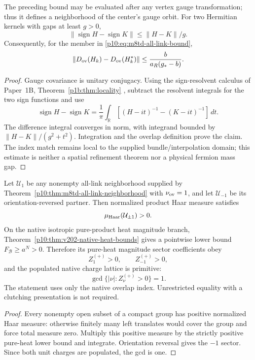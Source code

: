 \documentclass[12pt,a4paper]{article}
\begin{document}
\begin{corollary}
\label{p10:cor:m8td-overlap-continuity}
The preceding bound may be evaluated after any vertex gauge transformation;
thus it defines a neighborhood of the center's gauge orbit. For two
Hermitian kernels with gaps at least $g>0$,
\[
 \|\operatorname{sign}H-\operatorname{sign}K\|\le\|H-K\|/g.
\]
Consequently, for the member in \eqref{p10:eq:m8td-all-link-bound},
\begin{equation}
 \|D_{\rm ov}(H_k)-D_{\rm ov}(H_k^*)\|
 \le\frac{b}{a_R(g_*-b)}.
 \label{p10:eq:m8td-overlap-continuity}
\end{equation}
\end{corollary}
\begin{proof}
Gauge covariance is unitary conjugacy. Using the sign-resolvent
calculus of Paper~1B, Theorem~\ref{p1b:thm:locality}
\cite{Kugelmann2026Paper1B}, subtract the resolvent integrals
for the two sign functions and use
\[
 \operatorname{sign}H-\operatorname{sign}K
 =\frac1\pi\int_{\mathbb R}
       [(H-it)^{-1}-(K-it)^{-1}]\,dt.
\]
The difference integral converges in norm, with integrand bounded by
$\|H-K\|/(g^2+t^2)$. Integration and the overlap definition prove the
claim. The index match remains local to the supplied bundle/interpolation
domain; this estimate is neither a spatial refinement theorem nor a
physical fermion mass gap.
\end{proof}
\begin{theorem}
\label{p10:thm:v161-positive-primitive-native-sectors}
Let \(\mathcal U_1\) be any nonempty all-link neighborhood supplied by
Theorem~\ref{p10:thm:m8td-all-link-neighborhood} with \(\nu_{\rm ov}=1\), and
let \(\mathcal U_{-1}\) be its orientation-reversed partner.  Then normalized
product Haar measure satisfies
\[
 \mu_{\rm Haar}(\mathcal U_{\pm1})>0.
\]
On the native isotropic pure-product heat magnitude branch,
Theorem~\ref{p10:thm:v202-native-heat-bounds} gives a pointwise lower bound
\(F_{\mathcal B}\ge a^N>0\).  Therefore its pure-heat magnitude
sector coefficients obey
\[
 \boxed{Z^{(+)}_{1}>0,\qquad Z^{(+)}_{-1}>0,}
\]
and the populated native charge lattice is primitive:
\[
 \boxed{\gcd\{|\nu|:Z^{(+)}_\nu>0\}=1.}
\]
The statement uses only the native overlap index.  Unrestricted equality with
a clutching presentation is not required.
\end{theorem}
\begin{proof}
Every nonempty open subset of a compact group has positive normalized Haar
measure: otherwise finitely many left translates would cover the group and
force total measure zero.  Multiply this positive measure by the strictly
positive pure-heat lower bound and integrate.  Orientation reversal gives
the \(-1\) sector.  Since both unit charges are populated, the gcd is one.
\end{proof}
\end{document}
